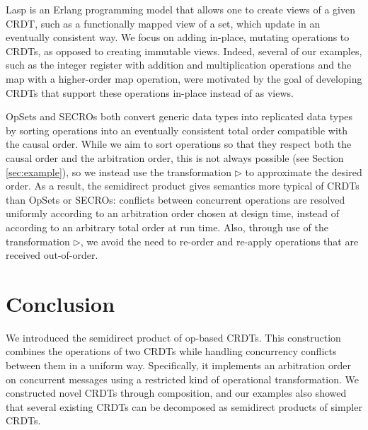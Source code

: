 \documentclass[acmsmall,nonacm,12pt]{acmart}
\newcommand{\msf}[1]{\ensuremath{\mathsf{#1}}}
\newcommand{\act}{\triangleright}
\theoremstyle{plain}
\theoremstyle{definition}
\begin{document}
Lasp \cite{lasp} is an Erlang programming model that allows one to create views of a given CRDT, such as a functionally mapped view of a set, which update in an eventually consistent way.  We focus on adding in-place, mutating operations to CRDTs, as opposed to creating immutable views.  Indeed, several of our examples, such as the integer register with addition and multiplication operations and the map with a higher-order map operation, were motivated by the goal of developing CRDTs that support these operations in-place instead of as views.


OpSets \cite{opsets} and SECROs \cite{generic_rdt} both convert generic data types into replicated data types by sorting operations into an eventually consistent total order compatible with the causal order.  While we aim to sort operations so that they respect both the causal order and the arbitration order, this is not always possible (see Section \ref{sec:example}), so we instead use the transformation $\act$ to approximate the desired order.  As a result, the semidirect product gives semantics more typical of CRDTs than OpSets or SECROs: conflicts between concurrent operations are resolved uniformly according to an arbitration order chosen at design time, instead of according to an arbitrary total order at run time.  Also, through use of the transformation $\act$, we avoid the need to re-order and re-apply operations that are received out-of-order.






\section{Conclusion}
We introduced the semidirect product of op-based CRDTs.  This construction combines the operations of two CRDTs while handling concurrency conflicts between them in a uniform way.  Specifically, it implements an arbitration order on concurrent messages using a restricted kind of operational transformation.  We constructed novel CRDTs through composition, and our examples also showed that several existing CRDTs can be decomposed as semidirect products of simpler CRDTs.
\end{document}
